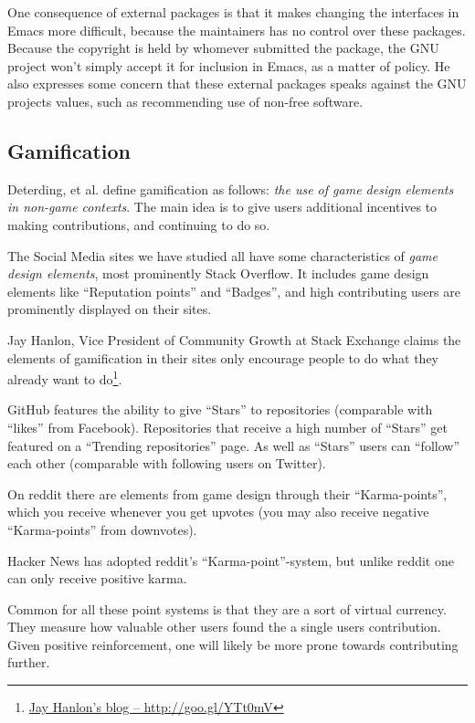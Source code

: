 \documentclass[a4paper,11pt]{article} %
\begin{document}
One consequence of external packages is that it makes changing the
interfaces in Emacs more difficult, because the maintainers has no
control over these packages. Because the copyright is held by whomever
submitted the package, the GNU project won't simply accept it for
inclusion in Emacs, as a matter of policy. He also expresses some
concern that these external packages speaks against the GNU projects
values, such as recommending use of non-free software.

\subsection{Gamification}
\label{gamification}

Deterding, et al.\cite{deterding2011game} define gamification as follows:
\textit{the use of game design elements in non-game contexts}. The main idea
is to give users additional incentives to making contributions, and continuing
to do so.

The Social Media sites we have studied all have some characteristics
of \textit{game design elements}, most prominently Stack Overflow. It
includes game design elements like ``Reputation points'' and
``Badges'', and high contributing users are prominently displayed on
their sites.

Jay Hanlon, Vice President of Community Growth at Stack Exchange
claims the elements of gamification in their sites only encourage
people to do what they already want to
do\footnote{{\href{http://blog.stackoverflow.com/2013/09/five-years-ago-stack-overflow-launched-then-a-miracle-occurred/}{Jay
      Hanlon's blog -- http://goo.gl/YTt0mV}}}.

GitHub features the ability to give ``Stars'' to repositories (comparable with
``likes'' from Facebook). Repositories that receive a high number of ``Stars''
get featured on a ``Trending repositories'' page. As well as ``Stars''
users can ``follow'' each other (comparable with following users on
Twitter).

On reddit there are elements from game design through their
``Karma-points'', which you receive whenever you get upvotes (you may
also receive negative ``Karma-points'' from downvotes).

Hacker News has adopted reddit's ``Karma-point''-system, but unlike reddit
one can only receive positive karma.

Common for all these point systems is that they are a sort of virtual
currency. They measure how valuable other users found the a single users
contribution. Given positive reinforcement, one will likely be more prone
towards contributing further.
\end{document}
